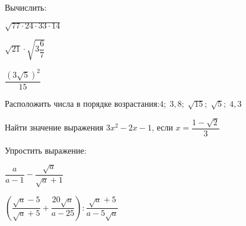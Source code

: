 \begin{listofex}
	\item Вычислить:
	\begin{enumcols}[itemcolumns=3]
		\item \( \sqrt{77\cdot24\cdot33\cdot14} \)
		\item \( \sqrt{21}\cdot\sqrt{3\dfrac{6}{7}} \)
		\item \( \dfrac{(3\sqrt{5})^2}{15} \)
	\end{enumcols}
	
	\item Расположить числа в порядке возрастания:\quad\( 4;\;3,8;\;\sqrt{15};\;\sqrt{5};\;4,3 \)
	
	\item Найти значение выражения \( 3x^2-2x-1 \), если \( x=\dfrac{1-\sqrt{2}}{3} \)
	
	\item Упростить выражение:
	\begin{enumcols}[itemcolumns=2]
		\item \( \dfrac{a}{a-1}-\dfrac{\sqrt{a}}{\sqrt{a}+1} \)
		\item \( \left( \dfrac{\sqrt{a}-5}{\sqrt{a}+5}+\dfrac{20\sqrt{a}}{a-25} \right):\dfrac{\sqrt{a}+5}{a-5\sqrt{a}} \)
	\end{enumcols}


\end{listofex}
